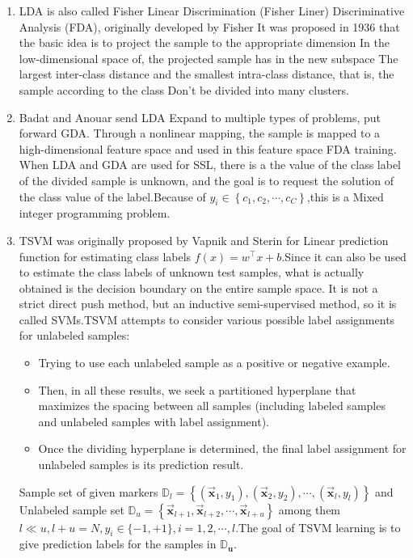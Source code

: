 \documentclass[11pt,en]{elegantpaper}
\begin{document}
\begin{enumerate}
\item LDA is also called Fisher Linear Discrimination (Fisher Liner)
Discriminative Analysis (FDA), originally developed by Fisher
It was proposed in 1936 that the basic idea is to project the sample to the appropriate dimension
In the low-dimensional space of, the projected sample has in the new subspace
The largest inter-class distance and the smallest intra-class distance, that is, the sample according to the class
Don't be divided into many clusters.
\item Badat and Anouar send LDA
Expand to multiple types of problems, put forward GDA. Through a nonlinear mapping, the
sample is mapped to a high-dimensional feature space and used in this feature space
FDA training. When LDA and GDA are used for SSL, there is a
the value of the class label of the divided sample is unknown, and the goal is to request the solution of the class value of the label.Because of $y_{i} \in\left\{c_{1}, c_{2}, \cdots, c_{C}\right\}$,this is a Mixed integer programming problem.
\item TSVM was originally proposed by Vapnik and Sterin for Linear prediction function for estimating class labels $f(x)=w^{\top} x+b$.Since it can also be used to estimate the class labels of unknown test samples, what is actually obtained is the decision boundary on the entire sample space. It is not a strict direct push method, but an inductive semi-supervised method, so it is called SVMs.TSVM attempts to consider various possible label assignments for unlabeled samples:
\begin{itemize}
	\item Trying to use each unlabeled sample as a positive or negative example.
	\item Then, in all these results, we seek a partitioned hyperplane that maximizes the spacing between all samples (including labeled samples and unlabeled samples with label assignment).
	\item Once the dividing hyperplane is determined, the final label assignment for unlabeled samples is its prediction result.
\end{itemize}
Sample set of given markers $\mathbb{D}_{l}=\left\{\left(\overrightarrow{\mathbf{x}}_{1}, y_{1}\right),\left(\overrightarrow{\mathbf{x}}_{2}, y_{2}\right), \cdots,\left(\overrightarrow{\mathbf{x}}_{l}, y_{l}\right)\right\}$ and Unlabeled sample set $\mathbb{D}_{u}=\left\{\overrightarrow{\mathbf{x}}_{l+1}, \overrightarrow{\mathbf{x}}_{l+2}, \cdots, \overrightarrow{\mathbf{x}}_{l+u}\right\}$ among them $l \ll u, l+u=N, y_{i} \in\{-1,+1\}, i=1,2, \cdots, l$.The goal of TSVM learning is to give prediction labels for the samples in $\mathbb{D}_{\boldsymbol{u}}$.\\

\end{enumerate}
\end{document}
